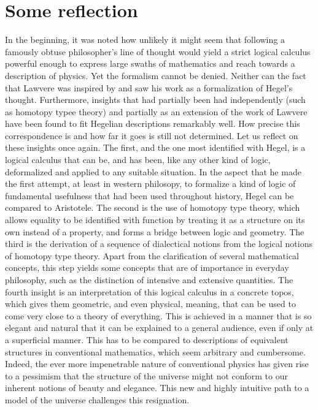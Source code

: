 \documentclass{article}
\begin{document}
\section{Some reflection}
In the beginning, it was noted how unlikely it might seem that following a famously obtuse philosopher's
line of thought would yield a strict logical calculus powerful enough to express large swaths of mathematics
and reach towards a description of physics. Yet the formalism cannot be denied. Neither can the fact that
Lawvere was inspired by and saw his work as a formalization of Hegel's thought. Furthermore, insights
that had partially been had independently (such as homotopy typee theory) and partially as an extension
of the work of Lawvere have been found to fit Hegelian descriptions remarkably well. How precise this
correspondence is and how far it goes is still not determined. Let us reflect on these insights once again.
The first, and the one most identified with Hegel, is a logical calculus that can be, and has been, like
any other kind of logic, deformalized and applied to any suitable situation. In the aspect that he made
the first attempt, at least in western philosopy, to formalize a kind of logic of fundamental usefulness
that had been used throughout history, Hegel can be compared to Aristotele. The second is the use of homotopy
type theory, which allows equality to be identified with function by treating it as a structure on its
own instead of a property, and forms a bridge between logic and geometry. The third is the derivation
of a sequence of dialectical notions from the logical notions of homotopy type theory. Apart from the
clarification of several mathematical concepts, this step yields some concepts that are of importance
in everyday philosophy, such as the distinction of intensive and extensive quantities. The fourth insight
is an interpretation of this logical calculus in a concrete topos, which gives them geometric, and even
physical, meaning, that can be used to come very close to a theory of everything. This is achieved in
a manner that is so elegant and natural that it can be explained to a general audience, even if only at
a superficial manner. This has to be compared to descriptions of equivalent structures in conventional
mathematics, which seem arbitrary and cumbersome. Indeed, the ever more impenetrable nature of conventional
physics has given rise to a pessimism that the structure of the universe might not conform to our inherent
notions of beauty and elegance. This new and highly intuitive path to a model of the universe challenges
this resignation. \\
\end{document}
